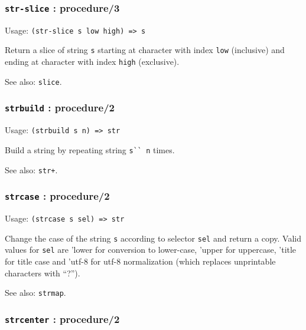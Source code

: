 \documentclass[
]{article}
\newcommand{\passthrough}[1]{#1}
\begin{document}
\hypertarget{str-slice-procedure3}{%
\subsubsection{\texorpdfstring{\texttt{str-slice} :
procedure/3}{str-slice : procedure/3}}\label{str-slice-procedure3}}

Usage: \passthrough{\lstinline!(str-slice s low high) => s!}

Return a slice of string \passthrough{\lstinline!s!} starting at
character with index \passthrough{\lstinline!low!} (inclusive) and
ending at character with index \passthrough{\lstinline!high!}
(exclusive).

See also: \passthrough{\lstinline!slice!}.

\hypertarget{strbuild-procedure2}{%
\subsubsection{\texorpdfstring{\texttt{strbuild} :
procedure/2}{strbuild : procedure/2}}\label{strbuild-procedure2}}

Usage: \passthrough{\lstinline!(strbuild s n) => str!}

Build a string by repeating string \passthrough{\lstinline!s`` n!}
times.

See also: \passthrough{\lstinline!str+!}.

\hypertarget{strcase-procedure2}{%
\subsubsection{\texorpdfstring{\texttt{strcase} :
procedure/2}{strcase : procedure/2}}\label{strcase-procedure2}}

Usage: \passthrough{\lstinline!(strcase s sel) => str!}

Change the case of the string \passthrough{\lstinline!s!} according to
selector \passthrough{\lstinline!sel!} and return a copy. Valid values
for \passthrough{\lstinline!sel!} are 'lower for conversion to
lower-case, 'upper for uppercase, 'title for title case and 'utf-8 for
utf-8 normalization (which replaces unprintable characters with ``?'').

See also: \passthrough{\lstinline!strmap!}.

\hypertarget{strcenter-procedure2}{%
\subsubsection{\texorpdfstring{\texttt{strcenter} :
procedure/2}{strcenter : procedure/2}}\label{strcenter-procedure2}}
\end{document}
